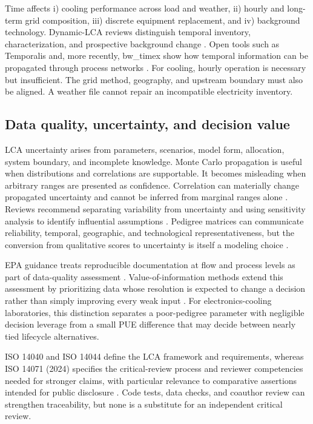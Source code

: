 \documentclass[review,12pt]{elsarticle}
\begin{document}
Time affects i) cooling performance across load and weather, ii) hourly and long-term grid composition, iii) discrete equipment replacement, and iv) background technology. Dynamic-LCA reviews distinguish temporal inventory, characterization, and prospective background change \cite{ref25,ref26}. Open tools such as Temporalis and, more recently, bw\_timex show how temporal information can be propagated through process networks \cite{ref27,ref28,ref29}. For cooling, hourly operation is necessary but insufficient. The grid method, geography, and upstream boundary must also be aligned. A weather file cannot repair an incompatible electricity inventory.

\subsection{Data quality, uncertainty, and decision value}
LCA uncertainty arises from parameters, scenarios, model form, allocation, system boundary, and incomplete knowledge. Monte Carlo propagation is useful when distributions and correlations are supportable. It becomes misleading when arbitrary ranges are presented as confidence. Correlation can materially change propagated uncertainty and cannot be inferred from marginal ranges alone \cite{ref30}. Reviews recommend separating variability from uncertainty and using sensitivity analysis to identify influential assumptions \cite{ref31}. Pedigree matrices can communicate reliability, temporal, geographic, and technological representativeness, but the conversion from qualitative scores to uncertainty is itself a modeling choice \cite{ref32,ref33}.

EPA guidance treats reproducible documentation at flow and process levels as part of data-quality assessment \cite{ref33}. Value-of-information methods extend this assessment by prioritizing data whose resolution is expected to change a decision rather than simply improving every weak input \cite{ref34}. For electronics-cooling laboratories, this distinction separates a poor-pedigree parameter with negligible decision leverage from a small PUE difference that may decide between nearly tied lifecycle alternatives.

ISO 14040 and ISO 14044 define the LCA framework and requirements, whereas ISO 14071 (2024) specifies the critical-review process and reviewer competencies needed for stronger claims, with particular relevance to comparative assertions intended for public disclosure \cite{ref35,ref36}. Code tests, data checks, and coauthor review can strengthen traceability, but none is a substitute for an independent critical review.
\end{document}

